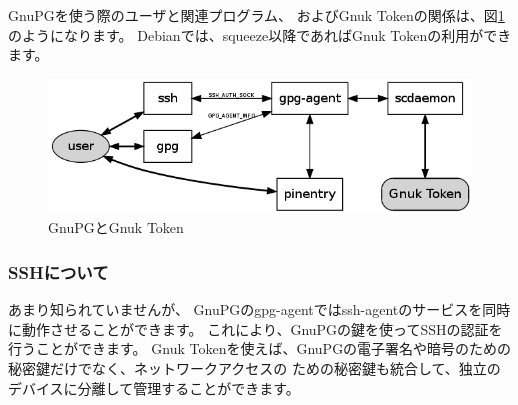 \documentclass[mingoth,a4paper,twoside]{jsarticle}
\begin{document}
GnuPGを使う際のユーザと関連プログラム、
およびGnuk Tokenの関係は、図\ref{fig:gnupg-friends}のようになります。
Debianでは、squeeze以降であればGnuk Tokenの利用ができます。

\begin{figure}[h]
\centering
\includegraphics[width=.8\hsize]{image2013-gum/gnupg-friends.png}
\caption{GnuPGとGnuk Token}
\label{fig:gnupg-friends}
\end{figure}

\subsubsection{SSHについて}
あまり知られていませんが、
GnuPGのgpg-agentではssh-agentのサービスを同時に動作させることができます。
これにより、GnuPGの鍵を使ってSSHの認証を行うことができます。
Gnuk Tokenを使えば、GnuPGの電子署名や暗号のための秘密鍵だけでなく、ネットワークアクセスの
ための秘密鍵も統合して、独立のデバイスに分離して管理することができます。
\end{document}
